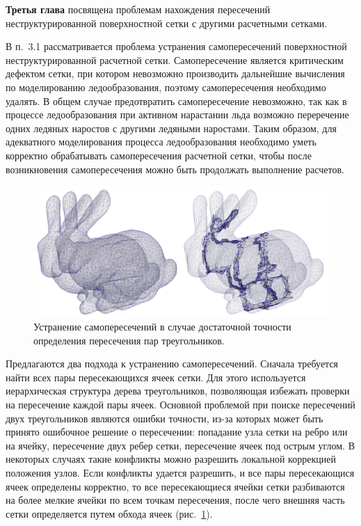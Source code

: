 \documentclass[a4paper,14pt]{extarticle}                     %
\theoremstyle{plain}                                         %
\begin{document}

\newpage
\textbf{Третья глава} посвящена проблемам нахождения пересечений неструктурированной поверхностной сетки с другими расчетными сетками.

В п.~3.1 рассматривается проблема устранения самопересечений поверхностной неструктурированной расчетной сетки.
Самопересечение является критическим дефектом сетки, при котором невозможно производить дальнейшие вычисления по моделированию ледообразования, поэтому самопересечения необходимо удалять.
В общем случае предотвратить самопересечение невозможно, так как в процессе ледообразования при активном нарастании льда возможно переречение одних ледяных наростов с другими ледяными наростами.
Таким образом, для адекватного моделирования процесса ледообразования необходимо уметь корректно обрабатывать самопересечения расчетной сетки, чтобы после возникновения самопересечения можно быть продолжать выполнение расчетов.

\begin{figure}[!ht]
\centering
\includegraphics[width=1.0\textwidth]{./pics/text_1_int/bunnies_dbl.png}
\singlespacing
\caption{Устранение самопересечений в случае достаточной точности определения пересечения пар треугольников.}
\label{fig:text_1_int_1}
\end{figure}

Предлагаются два подхода к устранению самопересечений.
Сначала требуется найти всех пары пересекающихся ячеек сетки.
Для этого используется иерархическая структура дерева треугольников, позволяющая избежать проверки на пересечение каждой пары ячеек.
Основной проблемой при поиске пересечений двух треугольников являются ошибки точности, из-за которых может быть принято ошибочное решение о пересечении: попадание узла сетки на ребро или на ячейку, пересечение двух ребер сетки, пересечение ячеек под острым углом.
В некоторых случаях такие конфликты можно разрешить локальной коррекцией положения узлов.
Если конфликты удается разрешить, и все пары пересекающися ячеек определены корректно, то все пересекающиеся ячейки сетки разбиваются на более мелкие ячейки по всем точкам пересечения, после чего внешняя часть сетки определяется путем обхода ячеек (рис.~\ref{fig:text_1_int_1}).
\end{document}
